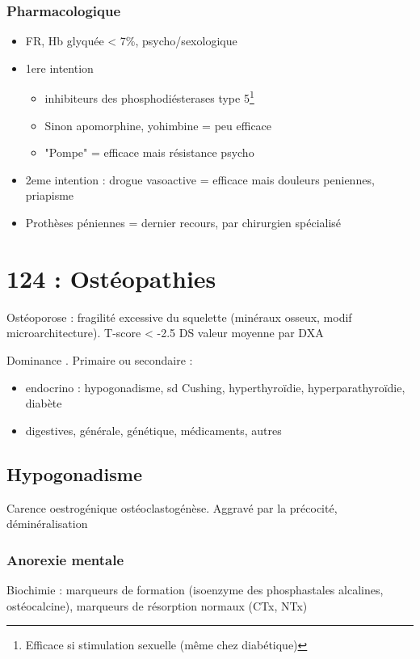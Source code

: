 \documentclass[11pt]{article}
\begin{document}
\subsubsection{Pharmacologique}
\label{sec:org48b76df}
\begin{itemize}
\item FR, Hb glyquée < 7\%, psycho/sexologique
\item 1ere intention 
\begin{itemize}
\item inhibiteurs des phosphodiésterases type 5\footnote{Efficace si stimulation sexuelle (même chez diabétique)}
\item Sinon apomorphine, yohimbine = peu efficace
\item "Pompe" = efficace mais résistance psycho
\end{itemize}
\item 2eme intention : drogue vasoactive = efficace mais douleurs peniennes, priapisme
\item Prothèses péniennes = dernier recours, par chirurgien spécialisé
\end{itemize}

\section{124 : Ostéopathies}
\label{sec:org0daa54f}
Ostéoporose : fragilité excessive du squelette (\dec minéraux osseux, modif
microarchitecture). T-score < -2.5 DS valeur moyenne par DXA

Dominance \female. Primaire ou secondaire :
\begin{itemize}
\item endocrino : hypogonadisme, sd Cushing, hyperthyroïdie, hyperparathyroïdie, diabète
\item digestives, générale, génétique, médicaments, autres
\end{itemize}

\subsection{Hypogonadisme}
\label{sec:orgfcee0a2}
Carence oestrogénique \inc ostéoclastogénèse. Aggravé par la précocité,
déminéralisation
\subsubsection{Anorexie mentale}
\label{sec:org8b58941}
Biochimie : marqueurs de formation \dec (isoenzyme des phosphastales alcalines,
ostéocalcine), marqueurs de résorption normaux (CTx, NTx) 
\end{document}
